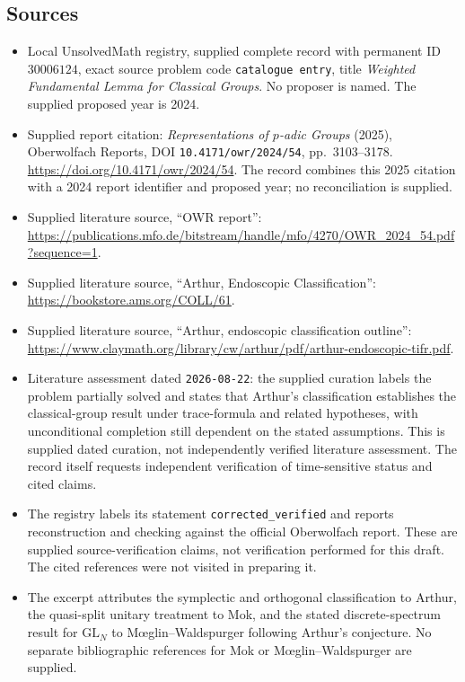 \documentclass[11pt]{article}
\begin{document}
\subsection{Sources}
\begin{itemize}
\item Local UnsolvedMath registry, supplied complete record with permanent ID \(30006124\), exact source problem code \texttt{catalogue entry}, title \emph{Weighted Fundamental Lemma for Classical Groups}. No proposer is named. The supplied proposed year is 2024.
\item Supplied report citation: \emph{Representations of \(p\)-adic Groups} (2025), Oberwolfach Reports, DOI \texttt{10.4171/owr/2024/54}, pp.\ 3103--3178. \url{https://doi.org/10.4171/owr/2024/54}. The record combines this 2025 citation with a 2024 report identifier and proposed year; no reconciliation is supplied.
\item Supplied literature source, ``OWR report'': \url{https://publications.mfo.de/bitstream/handle/mfo/4270/OWR_2024_54.pdf?sequence=1}.
\item Supplied literature source, ``Arthur, Endoscopic Classification'': \url{https://bookstore.ams.org/COLL/61}.
\item Supplied literature source, ``Arthur, endoscopic classification outline'': \url{https://www.claymath.org/library/cw/arthur/pdf/arthur-endoscopic-tifr.pdf}.
\item Literature assessment dated \texttt{2026-08-22}: the supplied curation labels the problem partially solved and states that Arthur's classification establishes the classical-group result under trace-formula and related hypotheses, with unconditional completion still dependent on the stated assumptions. This is supplied dated curation, not independently verified literature assessment. The record itself requests independent verification of time-sensitive status and cited claims.
\item The registry labels its statement \texttt{corrected\_verified} and reports reconstruction and checking against the official Oberwolfach report. These are supplied source-verification claims, not verification performed for this draft. The cited references were not visited in preparing it.
\item The excerpt attributes the symplectic and orthogonal classification to Arthur, the quasi-split unitary treatment to Mok, and the stated discrete-spectrum result for \(\mathrm{GL}_N\) to M\oe glin--Waldspurger following Arthur's conjecture. No separate bibliographic references for Mok or M\oe glin--Waldspurger are supplied.
\end{itemize}
\end{document}
